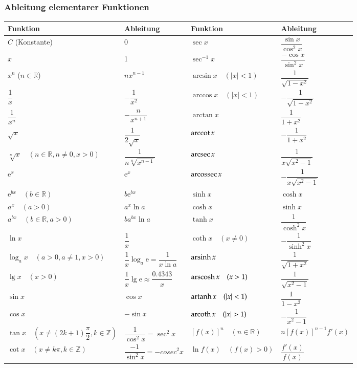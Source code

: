 {\subsubsection{Ableitung elementarer Funktionen }
\renewcommand{\arraystretch}{2.2}
\begin{tabular}{|l|l||l|l|}
	\hline
	\textbf{Funktion} & \textbf{Ableitung} & \textbf{Funktion} &
	\textbf{Ableitung}\\\hline
	\hline $C$ (Konstante) & 0 & $\sec x$ & $\dfrac{\sin x}{\cos^2 x}$ \\
	\hline $x$ & 1 & $\sec^{-1} x$ & $\dfrac{-\cos x}{\sin^2 x}$\\
	\hline $x^n$ ($n\in\mathbb{R}$) & $nx^{n-1}$ & $\arcsin x \quad (|x| < 1)$ &
	$\dfrac{1}{\sqrt{1-x^2}}$\\
	\hline $\dfrac{1}{x}$ & $-\dfrac{1}{x^2}$ & $\arccos x \quad (|x| < 1)$ &
	$-\dfrac{1}{\sqrt{1-x^2}}$\\
	\hline $\dfrac{1}{x^n}$ & $-\dfrac{n}{x^{n+1}}$ & $\arctan x$ & $\dfrac{1}{1+x^2}$\\
	\hline $\sqrt{x}$ & $\dfrac{1}{2\sqrt{x}}$ & $\operatorname{arccot}{x} $ & $-\dfrac{1}{1+x^2}$\\
	\hline $\sqrt[n]{x}\quad (n\in\mathbb{R}, n \neq 0, x > 0)$ &
	$\dfrac{1}{n\sqrt[n]{x^{n-1}}}$ & $\operatorname{arcsec} x$ & $\dfrac{1}{x\sqrt{x^2-1}}$\\
	\hline $\mathrm{e}^x$ & $\mathrm{e}^x$ & $\operatorname{arcossec} x$ & $-\dfrac{1}{x\sqrt{x^2-1}}$\\
	\hline $\mathrm{e}^{bx}\quad (b\in\mathbb{R})$ & $b\mathrm{e}^{bx}$ & $\sinh x$ &
	$\cosh x$\\
	\hline $a^x\quad (a > 0)$ & $a^x\ln a$ & $\cosh x$ & $\sinh x$\\
	\hline $a^{bx}\quad (b\in\mathbb{R}, a > 0)$ & $ba^{bx}\ln a$ & $\tanh x$ &
	$\dfrac{1}{\cosh^2 x}$\\
	\hline $\ln x$ & $\dfrac{1}{x}$ & $\coth x \quad(x \neq 0)$ & $-\dfrac{1}{\sinh^2 x}$\\
	\hline $\log_a{x} \quad (a > 0, a \neq 1, x > 0)$ &
	$\dfrac{1}{x}\log_a{\mathrm{e}}=\dfrac{1}{x\ln a}$ & $\operatorname{arsinh} x$ &
	$\dfrac{1}{\sqrt{1+x^2}}$\\
	\hline $\lg x \quad (x > 0)$ & $\dfrac{1}{x}\lg \mathrm{e}\approx \dfrac{0.4343}{x}$
	& $\operatorname{arscosh} x \quad (x > 1)$ & $\dfrac{1}{\sqrt{x^2-1}}$\\
	\hline $\sin x$ & $\cos x$ & $\operatorname{artanh} x \quad (|x| < 1)$ & $\dfrac{1}{1-x^2}$\\
	\hline $\cos x$ & $-\sin x$ & $\operatorname{arcoth} x \quad (|x| > 1)$ & $-\dfrac{1}{x^2-1}$\\
	\hline $\tan x \quad (x\neq(2k+1)\dfrac{\pi}{2}, k\in\mathbb{Z})$ & $\dfrac{1}{\cos^2
		x}=\sec^2 x$ & $[f(x)]^n \quad (n\in\mathbb{R})$ & $n[f(x)]^{n-1}f'(x)$\\
	\hline $\cot x \quad (x\neq k\pi, k\in\mathbb{Z})$ & $\dfrac{-1}{\sin^2 x}=-cosec^2x$ & $\ln f(x) \quad (f(x)> 0)$ & $\dfrac{f'(x)}{f(x)}$\\
	\hline
\end{tabular}
}
